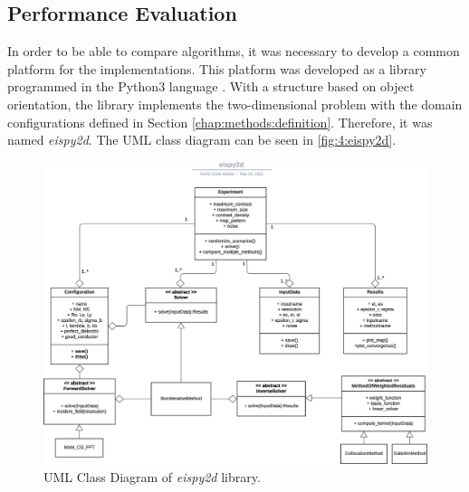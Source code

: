 		\subsection{Performance Evaluation}\label{chap:investigation:proposal:performance}
		
			In order to be able to compare algorithms, it was necessary to develop a common platform for the implementations. This platform was developed as a library programmed in the Python3 language \citep{python3}. With a structure based on object orientation, the library implements the two-dimensional problem with the domain configurations defined in Section \ref{chap:methods:definition}. Therefore, it was named \textit{eispy2d}. The UML class diagram can be seen in \autoref{fig:4:eispy2d}.
			\begin{figure}[p]
				\centering
				\hspace*{-1in}
				\includegraphics[width=.95\paperwidth, angle=90]{./figuras/eispy2d.eps}
				\vspace*{0.2in}
				\caption{UML Class Diagram of \textit{eispy2d} library.}
				\label{fig:4:eispy2d}
			\end{figure}
		
